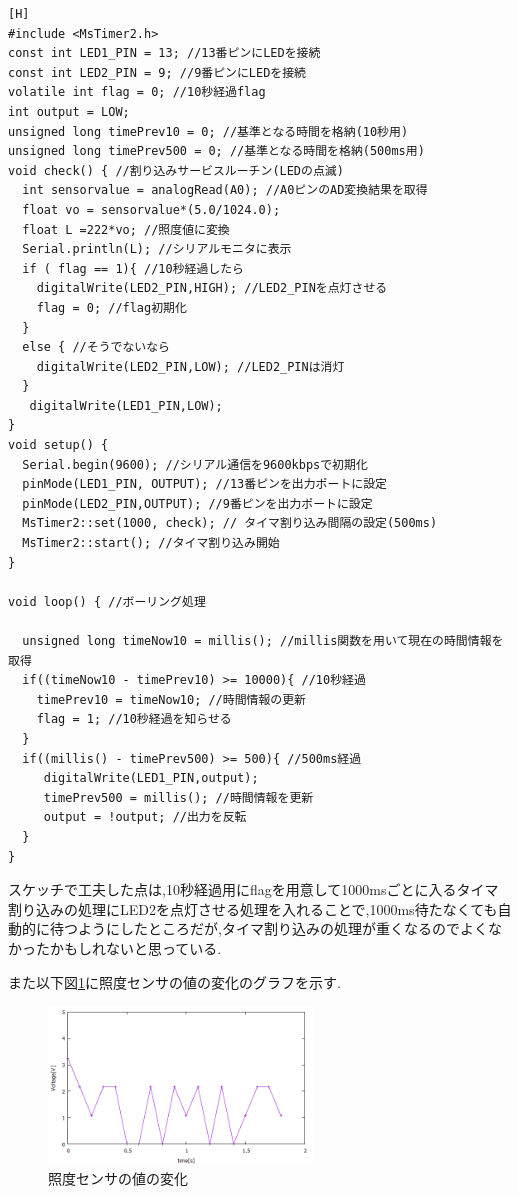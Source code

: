 \documentclass{jarticle}
\begin{document}
\begin{lstlisting}[caption = 発展課題2.4.1,label=code:hatten2-4-1][H]
#include <MsTimer2.h>
const int LED1_PIN = 13; //13番ピンにLEDを接続
const int LED2_PIN = 9; //9番ピンにLEDを接続
volatile int flag = 0; //10秒経過flag
int output = LOW;
unsigned long timePrev10 = 0; //基準となる時間を格納(10秒用)
unsigned long timePrev500 = 0; //基準となる時間を格納(500ms用)
void check() { //割り込みサービスルーチン(LEDの点滅)
  int sensorvalue = analogRead(A0); //A0ピンのAD変換結果を取得
  float vo = sensorvalue*(5.0/1024.0);
  float L =222*vo; //照度値に変換
  Serial.println(L); //シリアルモニタに表示
  if ( flag == 1){ //10秒経過したら
    digitalWrite(LED2_PIN,HIGH); //LED2_PINを点灯させる
    flag = 0; //flag初期化
  }
  else { //そうでないなら
    digitalWrite(LED2_PIN,LOW); //LED2_PINは消灯
  }
   digitalWrite(LED1_PIN,LOW);
}
void setup() {
  Serial.begin(9600); //シリアル通信を9600kbpsで初期化
  pinMode(LED1_PIN, OUTPUT); //13番ピンを出力ポートに設定
  pinMode(LED2_PIN,OUTPUT); //9番ピンを出力ポートに設定
  MsTimer2::set(1000, check); // タイマ割り込み間隔の設定(500ms)
  MsTimer2::start(); //タイマ割り込み開始
}

void loop() { //ボーリング処理
  
  unsigned long timeNow10 = millis(); //millis関数を用いて現在の時間情報を取得
  if((timeNow10 - timePrev10) >= 10000){ //10秒経過
    timePrev10 = timeNow10; //時間情報の更新
    flag = 1; //10秒経過を知らせる
  }
  if((millis() - timePrev500) >= 500){ //500ms経過
     digitalWrite(LED1_PIN,output);
     timePrev500 = millis(); //時間情報を更新
     output = !output; //出力を反転
  }
}
\end{lstlisting}

スケッチで工夫した点は,10秒経過用にflagを用意して1000msごとに入るタイマ割り込みの処理にLED2を点灯させる処理を入れることで,1000ms待たなくても自動的に待つようにしたところだが,タイマ割り込みの処理が重くなるのでよくなかったかもしれないと思っている.

また以下図\ref{fig:hatten2-4-1}に照度センサの値の変化のグラフを示す.

\begin{figure}[H]
\begin{center}
\includegraphics[width=7.0cm]{images/hatten2-4-1.png}
\caption{照度センサの値の変化}
\label{fig:hatten2-4-1}
\end{center}
\end{figure}
\end{document}
